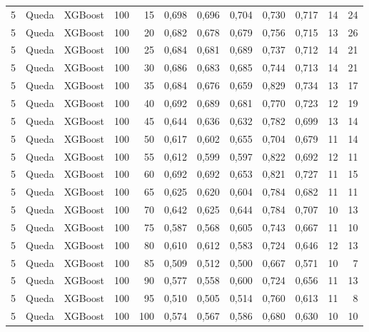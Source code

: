 \begin{longtable}{@{}rllrrrrrrrrr@{}}
5 & Queda & XGBoost & 100 & 15 & 0,698 & 0,696 & 0,704 & 0,730 & 0,717 & 14 & 24 \\
5 & Queda & XGBoost & 100 & 20 & 0,682 & 0,678 & 0,679 & 0,756 & 0,715 & 13 & 26 \\
5 & Queda & XGBoost & 100 & 25 & 0,684 & 0,681 & 0,689 & 0,737 & 0,712 & 14 & 21 \\
5 & Queda & XGBoost & 100 & 30 & 0,686 & 0,683 & 0,685 & 0,744 & 0,713 & 14 & 21 \\
5 & Queda & XGBoost & 100 & 35 & 0,684 & 0,676 & 0,659 & 0,829 & 0,734 & 13 & 17 \\
5 & Queda & XGBoost & 100 & 40 & 0,692 & 0,689 & 0,681 & 0,770 & 0,723 & 12 & 19 \\
5 & Queda & XGBoost & 100 & 45 & 0,644 & 0,636 & 0,632 & 0,782 & 0,699 & 13 & 14 \\
5 & Queda & XGBoost & 100 & 50 & 0,617 & 0,602 & 0,655 & 0,704 & 0,679 & 11 & 14 \\
5 & Queda & XGBoost & 100 & 55 & 0,612 & 0,599 & 0,597 & 0,822 & 0,692 & 12 & 11 \\
5 & Queda & XGBoost & 100 & 60 & 0,692 & 0,692 & 0,653 & 0,821 & 0,727 & 11 & 15 \\
5 & Queda & XGBoost & 100 & 65 & 0,625 & 0,620 & 0,604 & 0,784 & 0,682 & 11 & 11 \\
5 & Queda & XGBoost & 100 & 70 & 0,642 & 0,625 & 0,644 & 0,784 & 0,707 & 10 & 13 \\
5 & Queda & XGBoost & 100 & 75 & 0,587 & 0,568 & 0,605 & 0,743 & 0,667 & 11 & 10 \\
5 & Queda & XGBoost & 100 & 80 & 0,610 & 0,612 & 0,583 & 0,724 & 0,646 & 12 & 13 \\
5 & Queda & XGBoost & 100 & 85 & 0,509 & 0,512 & 0,500 & 0,667 & 0,571 & 10 & 7 \\
5 & Queda & XGBoost & 100 & 90 & 0,577 & 0,558 & 0,600 & 0,724 & 0,656 & 11 & 13 \\
5 & Queda & XGBoost & 100 & 95 & 0,510 & 0,505 & 0,514 & 0,760 & 0,613 & 11 & 8 \\
5 & Queda & XGBoost & 100 & 100 & 0,574 & 0,567 & 0,586 & 0,680 & 0,630 & 10 & 10 \\
\end{longtable}
